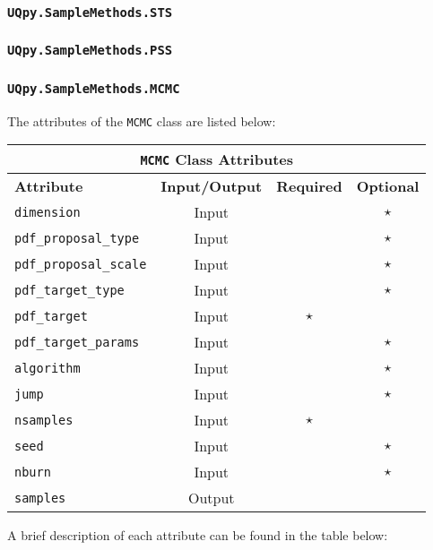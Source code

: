 \documentclass[./UsersGuide.tex]{subfiles}
\begin{document}
\subsubsection{\texttt{UQpy.SampleMethods.STS}}

\subsubsection{\texttt{UQpy.SampleMethods.PSS}}


\subsubsection{\texttt{UQpy.SampleMethods.MCMC}}

The attributes of the \texttt{MCMC} class are listed below:

\begin{center}
	\begin{tabular}{ |l|c|c|c| } 
				\hline
		\multicolumn{4}{|c|}{\texttt{MCMC} Class Attributes} \\
		\hline
		\textbf{Attribute} & \textbf{Input/Output} & \textbf{Required} & \textbf{Optional} \\
		\hline
		\texttt{dimension} & Input &  & $\star$  \\ 
		\hline
		\texttt{pdf\_proposal\_type} & Input & & $\star$   \\ 
		\hline
		\texttt{pdf\_proposal\_scale} & Input &  & $\star$  \\ 
		\hline
		\texttt{pdf\_target\_type}& Input &  &  $\star$  \\ 
		\hline
		\texttt{pdf\_target} & Input & $\star$ &   \\ 
		\hline
		\texttt{pdf\_target\_params} & Input  & &  $\star$  \\ 
		\hline
		\texttt{algorithm} & Input &  & $\star$  \\ 
		\hline
		\texttt{jump} & Input &  & $\star$  \\ 
		\hline
		\texttt{nsamples}& Input & $\star$ &    \\ 
		\hline
		\texttt{seed} & Input & & $\star$   \\ 
		\hline
		\texttt{nburn} & Input & & $\star$   \\ 
		\hline
		\texttt{samples} & Output & & \\
		\hline
	\end{tabular}%
\end{center}

\noindent
A brief description of each attribute can be found in the table below:
\end{document}
